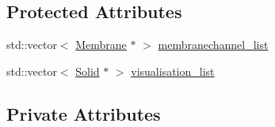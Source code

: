 \subsection*{Protected Attributes}
\begin{DoxyCompactItemize}
\item 
std\+::vector$<$ \mbox{\hyperlink{classMembrane}{Membrane}} $\ast$ $>$ \mbox{\hyperlink{classMembrane_ad41c9c20d5a1bc279f32f9001dee8c50}{membranechannel\+\_\+list}}
\item 
std\+::vector$<$ \mbox{\hyperlink{classSolid}{Solid}} $\ast$ $>$ \mbox{\hyperlink{classMembrane_a926d35c07f664b60deb6e9f87649fe89}{visualisation\+\_\+list}}
\end{DoxyCompactItemize}
\subsection*{Private Attributes}
